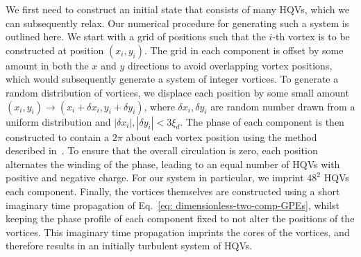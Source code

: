 We first need to construct an initial state that consists of many HQVs, which we
can subsequently relax.
Our numerical procedure for generating such a system is outlined here.
We start with a grid of positions such that the \(i\)-th vortex is to be
constructed at position \((x_i, y_i)\).
The grid in each component is offset by some amount in both the \(x\) and \(y\)
directions to avoid overlapping vortex positions, which would subsequently
generate a system of integer vortices.
To generate a random distribution of vortices, we displace each position by some
small amount \((x_i, y_i) \rightarrow (x_i + \delta x_i, y_i + \delta y_i)\),
where \(\delta x_i, \delta y_i\) are random number drawn from a uniform
distribution and \(|\delta x_i|, |\delta y_i| < 3\xi_d\).
The phase of each component is then constructed to contain a \( 2\pi \) about
each vortex position using the method described in~\cite{Billam2014}.
To ensure that the overall circulation is zero, each position alternates the
winding of the phase, leading to an equal number of HQVs with positive and
negative charge.
For our system in particular, we imprint \(48^2\) HQVs each component.
Finally, the vortices themselves are constructed using a short imaginary time
propagation of Eq.~\eqref{eq: dimensionless-two-comp-GPEs}, whilst keeping the
phase profile of each component fixed to not alter the positions of the
vortices.
This imaginary time propagation imprints the cores of the vortices, and
therefore results in an initially turbulent system of HQVs.

